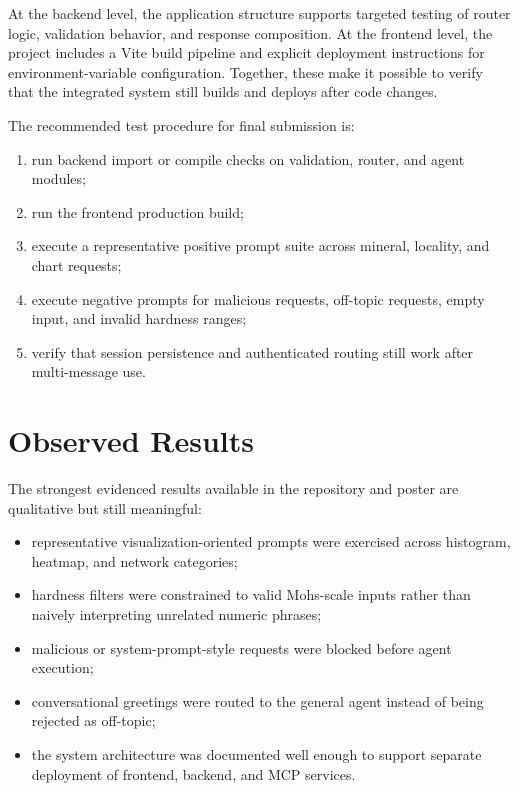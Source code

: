 \documentclass[12pt,oneside]{report}
\begin{document}
At the backend level, the application structure supports targeted testing of router logic, validation behavior, and response composition. At the frontend level, the project includes a Vite build pipeline and explicit deployment instructions for environment-variable configuration. Together, these make it possible to verify that the integrated system still builds and deploys after code changes.

The recommended test procedure for final submission is:
\begin{enumerate}[leftmargin=0.75in]
    \item run backend import or compile checks on validation, router, and agent modules;
    \item run the frontend production build;
    \item execute a representative positive prompt suite across mineral, locality, and chart requests;
    \item execute negative prompts for malicious requests, off-topic requests, empty input, and invalid hardness ranges;
    \item verify that session persistence and authenticated routing still work after multi-message use.
\end{enumerate}

\section{Observed Results}

The strongest evidenced results available in the repository and poster are qualitative but still meaningful:
\begin{itemize}[leftmargin=0.75in]
    \item representative visualization-oriented prompts were exercised across histogram, heatmap, and network categories;
    \item hardness filters were constrained to valid Mohs-scale inputs rather than naively interpreting unrelated numeric phrases;
    \item malicious or system-prompt-style requests were blocked before agent execution;
    \item conversational greetings were routed to the general agent instead of being rejected as off-topic;
    \item the system architecture was documented well enough to support separate deployment of frontend, backend, and MCP services.
\end{itemize}
\end{document}
